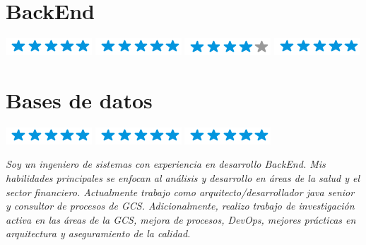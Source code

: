 \documentclass[]{cv-class}
\begin{document}
\begin{aside}
	\section{BackEnd}
	{\includegraphics[scale=0.40]{img/5stars.png}}
	{\includegraphics[scale=0.40]{img/5stars.png}}
	{\includegraphics[scale=0.40]{img/4stars.png}}
	{\includegraphics[scale=0.40]{img/5stars.png}}

	\section{Bases de datos}
	{\includegraphics[scale=0.40]{img/5stars.png}}
	{\includegraphics[scale=0.40]{img/5stars.png}}
	{\includegraphics[scale=0.40]{img/5stars.png}}

\end{aside}

\justifying
	\begin{small}
\textit{
    Soy un ingeniero de sistemas con experiencia en desarrollo BackEnd. Mis habilidades principales se enfocan al análisis y desarrollo en áreas de la salud y el sector financiero. Actualmente trabajo como arquitecto/desarrollador java senior y consultor de procesos de GCS. Adicionalmente, realizo trabajo de investigación activa en las áreas de la GCS, mejora de procesos, DevOps, mejores prácticas en arquitectura y aseguramiento de la calidad.}
	\end{small}
\end{document}
